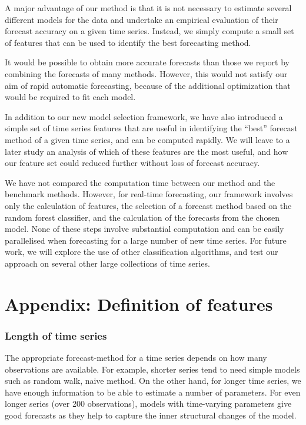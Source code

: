 \documentclass[11pt,a4paper,]{article}
\theoremstyle{definition}
\theoremstyle{definition}
\theoremstyle{definition}
\theoremstyle{remark}
\begin{document}
A major advantage of our method is that it is not necessary to estimate
several different models for the data and undertake an empirical
evaluation of their forecast accuracy on a given time series. Instead,
we simply compute a small set of features that can be used to identify
the best forecasting method.

It would be possible to obtain more accurate forecasts than those we
report by combining the forecasts of many methods. However, this would
not satisfy our aim of rapid automatic forecasting, because of the
additional optimization that would be required to fit each model.

In addition to our new model selection framework, we have also
introduced a simple set of time series features that are useful in
identifying the ``best'' forecast method of a given time series, and can
be computed rapidly. We will leave to a later study an analysis of which
of these features are the most useful, and how our feature set could
reduced further without loss of forecast accuracy.

We have not compared the computation time between our method and the
benchmark methods. However, for real-time forecasting, our framework
involves only the calculation of features, the selection of a forecast
method based on the random forest classifier, and the calculation of the
forecasts from the chosen model. None of these steps involve substantial
computation and can be easily parallelised when forecasting for a large
number of new time series. For future work, we will explore the use of
other classification algorithms, and test our approach on several other
large collections of time series.

\newpage

\section*{Appendix: Definition of
features}\label{appendix-definition-of-features}

\subsubsection*{Length of time series}\label{length-of-time-series}

The appropriate forecast-method for a time series depends on how many
observations are available. For example, shorter series tend to need
simple models such as random walk, naive method. On the other hand, for
longer time series, we have enough information to be able to estimate a
number of parameters. For even longer series (over 200 observations),
models with time-varying parameters give good forecasts as they help to
capture the inner structural changes of the model.
\end{document}
